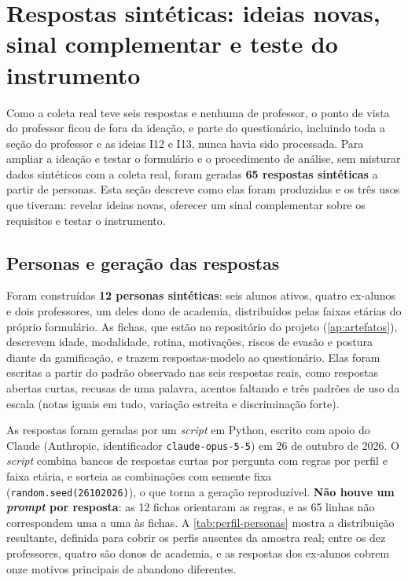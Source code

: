 \section{Respostas sintéticas: ideias novas, sinal complementar e teste do instrumento}
\label{sec:val-personas}

Como a coleta real teve seis respostas e nenhuma de professor, o ponto de
vista do professor ficou de fora da ideação, e parte do questionário,
incluindo toda a seção do professor e as ideias I12 e I13, nunca havia
sido processada. Para ampliar a ideação e testar o formulário e o
procedimento de análise, sem misturar dados sintéticos com a coleta
real, foram geradas \textbf{65 respostas sintéticas} a partir de
personas. Esta seção descreve como elas foram produzidas e os três usos
que tiveram: revelar ideias novas, oferecer um sinal complementar sobre
os requisitos e testar o instrumento.

\subsection{Personas e geração das respostas}

Foram construídas \textbf{12 personas sintéticas}: seis alunos ativos,
quatro ex-alunos e dois professores, um deles dono de academia,
distribuídos pelas faixas etárias do próprio formulário. As fichas, que estão
no repositório do projeto (\autoref{ap:artefatos}), descrevem idade, modalidade, rotina, motivações,
riscos de evasão e postura diante da gamificação, e trazem respostas-modelo
ao questionário. Elas foram escritas a partir do padrão observado nas seis
respostas reais, como respostas abertas curtas, recusas de uma palavra,
acentos faltando e três padrões de uso da escala (notas iguais em tudo,
variação estreita e discriminação forte).

As respostas foram geradas por um \textit{script} em Python, escrito com
apoio do Claude (Anthropic, identificador \texttt{claude-opus-5-5}) em
26 de outubro de 2026. O \textit{script} combina bancos de respostas
curtas por pergunta com regras por perfil e faixa etária, e sorteia as
combinações com semente fixa (\texttt{random.seed(26102026)}), o que
torna a geração reproduzível. \textbf{Não houve um \textit{prompt} por
resposta}: as 12 fichas orientaram as regras, e as 65 linhas não
correspondem uma a uma às fichas. A \autoref{tab:perfil-personas} mostra
a distribuição resultante, definida para cobrir os perfis ausentes da
amostra real; entre os dez professores, quatro são donos de academia, e
as respostas dos ex-alunos cobrem onze motivos principais de abandono
diferentes.

